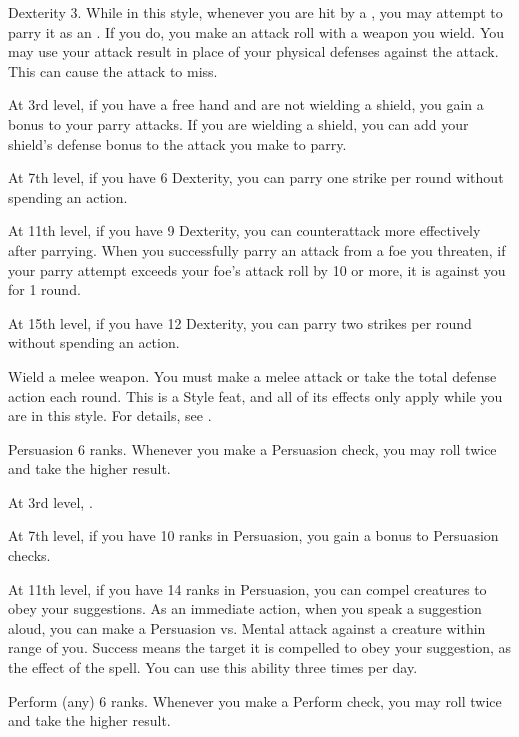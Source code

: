     \featpre Dexterity 3.
    \featben While in this style, whenever you are hit by a , you may attempt to parry it as an .
    If you do, you make an attack roll with a weapon you wield.
    You may use your attack result in place of your physical defenses against the attack.
    This can cause the attack to miss.

    At 3rd level, if you have a free hand and are not wielding a shield, you gain a  bonus to your parry attacks.
    If you are wielding a shield, you can add your shield's defense bonus to the attack you make to parry.

    At 7th level, if you have 6 Dexterity, you can parry one strike per round without spending an action.

    At 11th level, if you have 9 Dexterity, you can counterattack more effectively after parrying.
    When you successfully parry an attack from a foe you threaten, if your parry attempt exceeds your foe's attack roll by 10 or more, it is  against you for 1 round.

    At 15th level, if you have 12 Dexterity, you can parry two strikes per round without spending an action.

    \stylereq Wield a melee weapon.
    You must make a melee attack or take the total defense action each round.
     This is a Style feat, and all of its effects only apply while you are in this style.
    For details, see .

    \featpre Persuasion 6 ranks.
    \featben Whenever you make a Persuasion check, you may roll twice and take the higher result.

    At 3rd level, \tdash.

    At 7th level, if you have 10 ranks in Persuasion, you gain a  bonus to Persuasion checks.

    At 11th level, if you have 14 ranks in Persuasion, you can compel creatures to obey your suggestions.
    As an immediate action, when you speak a suggestion aloud, you can make a Persuasion vs. Mental attack against a creature within \rngmed range of you.
    Success means the target it is compelled to obey your suggestion, as the effect of the  spell.
    You can use this ability three times per day.
    \magical

    \featpre Perform (any) 6 ranks.
    \featben Whenever you make a Perform check, you may roll twice and take the higher result.

